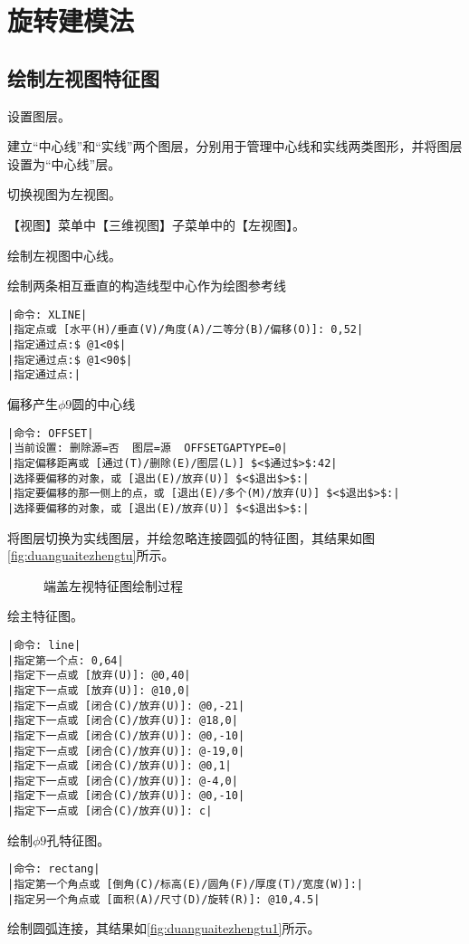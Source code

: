 \section{旋转建模法}
\subsection{绘制左视图特征图}
\begin{procedure}
\item 设置图层。

建立“中心线”和“实线”两个图层，分别用于管理中心线和实线两类图形，并将图层设置为“中心线”层。
\item 切换视图为左视图。

【视图】菜单中【三维视图】子菜单中的【左视图】。

\item 绘制左视图中心线。

绘制两条相互垂直的构造线型中心作为绘图参考线
\begin{lstlisting}
|命令: XLINE|
|指定点或 [水平(H)/垂直(V)/角度(A)/二等分(B)/偏移(O)]: 0,52|
|指定通过点:$ @1<0$|
|指定通过点:$ @1<90$|
|指定通过点:|
\end{lstlisting}
偏移产生$\phi 9$圆的中心线
\begin{lstlisting}
|命令: OFFSET|
|当前设置: 删除源=否  图层=源  OFFSETGAPTYPE=0|
|指定偏移距离或 [通过(T)/删除(E)/图层(L)] $<$通过$>$:42|
|选择要偏移的对象，或 [退出(E)/放弃(U)] $<$退出$>$:|
|指定要偏移的那一侧上的点，或 [退出(E)/多个(M)/放弃(U)] $<$退出$>$:|
|选择要偏移的对象，或 [退出(E)/放弃(U)] $<$退出$>$:|
\end{lstlisting}
\item 将图层切换为实线图层，并绘忽略连接圆弧的特征图，其结果如图\ref{fig:duanguaitezhengtu}所示。
\begin{figure}[htbp]
\centering
{}\hspace{30pt}
\caption{端盖左视特征图绘制过程}
\end{figure}
绘主特征图。
\begin{lstlisting}
|命令: line|
|指定第一个点: 0,64|
|指定下一点或 [放弃(U)]: @0,40|
|指定下一点或 [放弃(U)]: @10,0|
|指定下一点或 [闭合(C)/放弃(U)]: @0,-21|
|指定下一点或 [闭合(C)/放弃(U)]: @18,0|
|指定下一点或 [闭合(C)/放弃(U)]: @0,-10|
|指定下一点或 [闭合(C)/放弃(U)]: @-19,0|
|指定下一点或 [闭合(C)/放弃(U)]: @0,1|
|指定下一点或 [闭合(C)/放弃(U)]: @-4,0|
|指定下一点或 [闭合(C)/放弃(U)]: @0,-10|
|指定下一点或 [闭合(C)/放弃(U)]: c|
\end{lstlisting}
绘制$\phi 9$孔特征图。
\begin{lstlisting}
|命令: rectang|
|指定第一个角点或 [倒角(C)/标高(E)/圆角(F)/厚度(T)/宽度(W)]:|
|指定另一个角点或 [面积(A)/尺寸(D)/旋转(R)]: @10,4.5|
\end{lstlisting}
\item 绘制圆弧连接，其结果如\ref{fig:duanguaitezhengtu1}所示。


\end{procedure}
